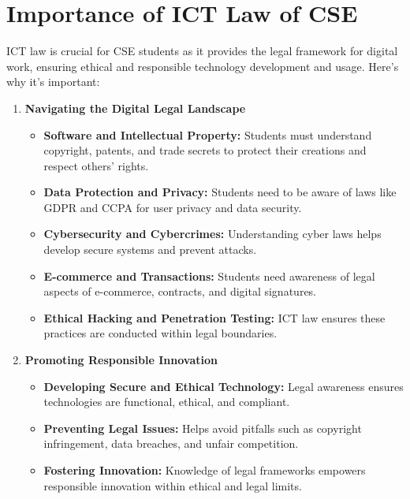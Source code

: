 \vspace{2em}
\section{Importance of ICT Law of CSE}

ICT law is crucial for CSE students as it provides the legal framework for digital work, ensuring ethical and responsible technology development and usage.
Here's why it's important:


\begin{enumerate}[itemsep=1em, leftmargin=1em]
   \item \textbf{Navigating the Digital Legal Landscape}
   \begin{itemize}[itemsep=0.5em]
      \item	\textbf{Software and Intellectual Property:} Students must understand copyright, patents, and trade secrets to protect their creations and respect others' rights.
      \item	\textbf{Data Protection and Privacy:} Students need to be
      aware of laws like GDPR and CCPA for user privacy and data security.
      \item	\textbf{Cybersecurity and Cybercrimes:} Understanding cyber laws helps develop secure systems and prevent attacks.
      \item	\textbf{E-commerce and Transactions:} Students need awareness of legal aspects of e-commerce, contracts, and digital signatures.
      \item	\textbf{Ethical Hacking and Penetration Testing:} ICT law ensures these practices are conducted within legal boundaries.
   \end{itemize}
   
   \item \textbf{Promoting Responsible Innovation}
   \begin{itemize}[itemsep=0.5em]
      \item	\textbf{Developing Secure and Ethical Technology:} Legal awareness ensures technologies are functional, ethical, and compliant.
      \item	\textbf{Preventing Legal Issues:} Helps avoid pitfalls such as copyright infringement, data breaches, and unfair competition.
      \item	\textbf{Fostering Innovation:} Knowledge of legal frameworks empowers responsible innovation within ethical and legal limits.
   \end{itemize}
   

\end{enumerate}
